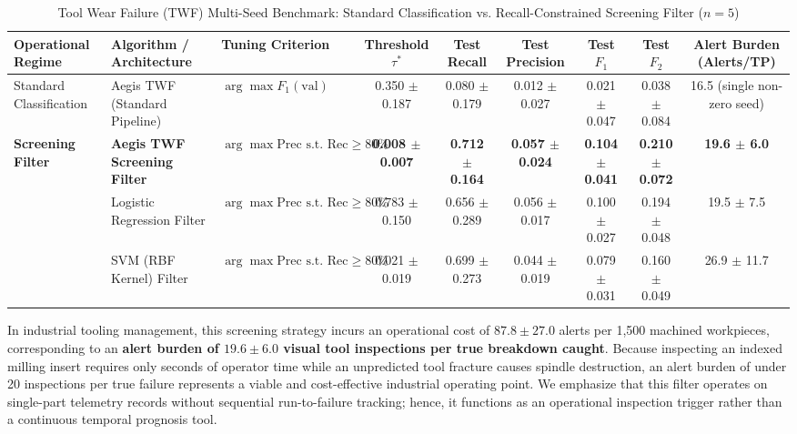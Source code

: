 \documentclass[conference]{IEEEtran}
\begin{document}
\begin{itemize}
\begin{table}[t]
\caption{Tool Wear Failure (TWF) Multi-Seed Benchmark: Standard Classification vs. Recall-Constrained Screening Filter ($n=5$)}
\centering
\begin{tabular}{lllcccccc}
\toprule
\textbf{Operational Regime} & \textbf{Algorithm / Architecture} & \textbf{Tuning Criterion} & \textbf{Threshold $\tau^*$} & \textbf{Test Recall} & \textbf{Test Precision} & \textbf{Test $F_1$} & \textbf{Test $F_2$} & \textbf{Alert Burden (Alerts/TP)} \\
\midrule
Standard Classification & Aegis TWF (Standard Pipeline) & $\arg\max F_1(\text{val})$ & 0.350 $\pm$ 0.187 & 0.080 $\pm$ 0.179 & 0.012 $\pm$ 0.027 & 0.021 $\pm$ 0.047 & 0.038 $\pm$ 0.084 & 16.5 (single non-zero seed) \\
\midrule
\multirow{3}{*}{\textbf{Screening Filter}} & \textbf{Aegis TWF Screening Filter} & $\arg\max \text{Prec s.t. Rec} \ge 80\%$ & \textbf{0.008 $\pm$ 0.007} & \textbf{0.712 $\pm$ 0.164} & \textbf{0.057 $\pm$ 0.024} & \textbf{0.104 $\pm$ 0.041} & \textbf{0.210 $\pm$ 0.072} & \textbf{19.6 $\pm$ 6.0} \\
 & Logistic Regression Filter & $\arg\max \text{Prec s.t. Rec} \ge 80\%$ & 0.783 $\pm$ 0.150 & 0.656 $\pm$ 0.289 & 0.056 $\pm$ 0.017 & 0.100 $\pm$ 0.027 & 0.194 $\pm$ 0.048 & 19.5 $\pm$ 7.5 \\
 & SVM (RBF Kernel) Filter & $\arg\max \text{Prec s.t. Rec} \ge 80\%$ & 0.021 $\pm$ 0.019 & 0.699 $\pm$ 0.273 & 0.044 $\pm$ 0.019 & 0.079 $\pm$ 0.031 & 0.160 $\pm$ 0.049 & 26.9 $\pm$ 11.7 \\
\bottomrule
\end{tabular}
\label{tab:twf_screening}
\end{table}

In industrial tooling management, this screening strategy incurs an operational cost of $87.8 \pm 27.0$ alerts per 1,500 machined workpieces, corresponding to an \textbf{alert burden of $19.6 \pm 6.0$ visual tool inspections per true breakdown caught}. Because inspecting an indexed milling insert requires only seconds of operator time while an unpredicted tool fracture causes spindle destruction, an alert burden of under 20 inspections per true failure represents a viable and cost-effective industrial operating point. We emphasize that this filter operates on single-part telemetry records without sequential run-to-failure tracking; hence, it functions as an operational inspection trigger rather than a continuous temporal prognosis tool.


\end{itemize}
\end{document}
